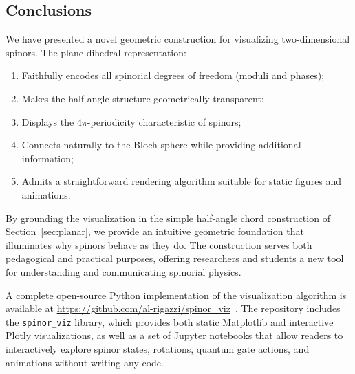 \subsection{Conclusions}
\label{sec:disc_conclusions}

We have presented a novel geometric construction for visualizing two-dimensional spinors. The plane-dihedral representation:
\begin{enumerate}
    \item Faithfully encodes all spinorial degrees of freedom (moduli and phases);
    \item Makes the half-angle structure geometrically transparent;
    \item Displays the $4\pi$-periodicity characteristic of spinors;
    \item Connects naturally to the Bloch sphere while providing additional information;
    \item Admits a straightforward rendering algorithm suitable for static figures and animations.
\end{enumerate}

By grounding the visualization in the simple half-angle chord construction of Section~\ref{sec:planar}, we provide an intuitive geometric foundation that illuminates why spinors behave as they do. The construction serves both pedagogical and practical purposes, offering researchers and students a new tool for understanding and communicating spinorial physics.

A complete open-source Python implementation of the visualization algorithm is available at \url{https://github.com/al-rigazzi/spinor_viz}~\cite{spinor_viz_github}. The repository includes the \texttt{spinor\_viz} library, which provides both static Matplotlib and interactive Plotly visualizations, as well as a set of Jupyter notebooks that allow readers to interactively explore spinor states, rotations, quantum gate actions, and animations without writing any code.
